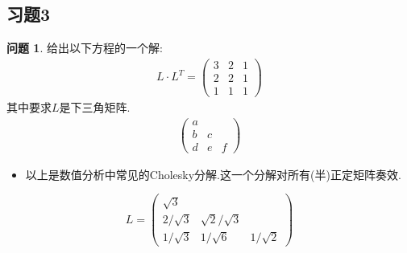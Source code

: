 \documentclass[11pt]{ctexart}
\theoremstyle{definition}
\newtheorem{qqq}{问题}[section]
\numberwithin{equation}{section}
\begin{document}
\subsection{习题3}
\begin{qqq}
    给出以下方程的一个解:
    \begin{align}
        L\cdot L^T=\begin{pmatrix}
            3&2&1\\2&2&1\\1&1&1
        \end{pmatrix}
    \end{align}
    其中要求$L$是下三角矩阵.
    \begin{align}
        \begin{pmatrix}
            a\\b&c\\d&e&f
        \end{pmatrix}
    \end{align}
    \begin{itemize}
        \item 以上是数值分析中常见的Cholesky分解.这一个分解对所有(半)正定矩阵奏效.
    \end{itemize}
\end{qqq}
\begin{aaa}
    $$L=\begin{pmatrix}
        \sqrt3\\2/\sqrt3&\sqrt2/\sqrt3\\1/\sqrt3&1/\sqrt6&1/\sqrt2

    \end{pmatrix}$$
\end{aaa}
\end{document}

